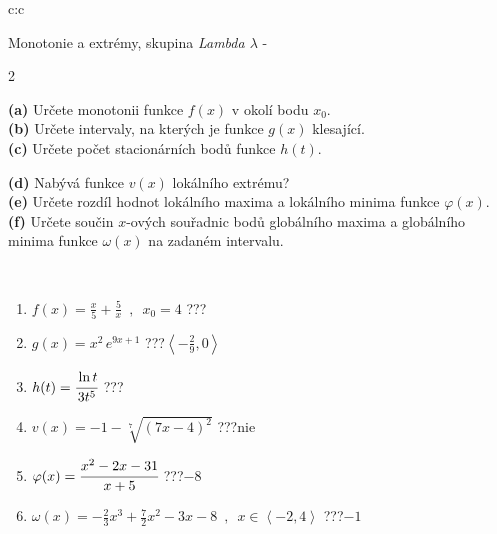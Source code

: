 \documentclass[10pt]{report}
\begin{document}
\newpage
\thispagestyle{empty}
\begin{tabular}{c:c}
\begin{minipage}[c][104.5mm][t]{0.5\linewidth}
\begin{center}
\vspace{7mm}
{\huge Monotonie a extrémy, skupina \textit{Lambda $\lambda$} -}\\[5mm]
\begin{minipage}{0.95\linewidth}
\begin{center}
{\small \begin{multicols}{2} \raggedright
\textbf{(a)} Určete monotonii funkce \(f(x)\) v okolí bodu \(x_0\). \\[1mm]
\textbf{(b)} Určete intervaly, na kterých je funkce \(g(x)\) klesající. \\[1mm]
\textbf{(c)} Určete počet stacionárních bodů funkce \(h(t)\). \par \columnbreak
\textbf{(d)} Nabývá funkce \(v(x)\) lokálního extrému? \\[1mm]
\textbf{(e)} Určete rozdíl hodnot lokálního maxima a lokálního minima funkce \(\varphi(x)\). \\[1mm]
\textbf{(f)} Určete součin \(x\)-ových souřadnic bodů globálního maxima a globálního minima funkce \(\omega(x)\) na zadaném intervalu. \\[1mm]
\end{multicols}
}
\end{center}
\end{minipage}
\\[4mm]
\begin{minipage}{0.79\linewidth}
\begin{center}
\begin{varwidth}{\linewidth}
\begin{enumerate}
\normalsize
\item $f(x)=\frac{x}{5}+\frac{5}{x} \enspace , \enspace x_0=4$\quad \dotfill\; ???\;\dotfill \quad {}
\item $g(x)=x^2\, e^{9x+1}$\quad \dotfill\; ???\;\dotfill \quad $\left\langle-\frac{2}{9} , 0\right\rangle$
\item $h(t)=\cfrac{\ln t}{3t^5}$\quad \dotfill\; ???\;\dotfill {}
\item $v(x)=-1-\sqrt[7]{(7x-4)^2}$\quad \dotfill\; ???\;\dotfill \quad $\text{nie}$
\item $\varphi(x)=\cfrac{x^2-2x-31}{x+5}$\quad \dotfill\; ???\;\dotfill \quad $-8$
\item $\omega(x)=-\frac{2}{3}x^3+\frac{7}{2}x^2-3x-8 \enspace , \enspace x\in\left\langle-2 , 4\right\rangle$\quad \dotfill\; ???\;\dotfill \quad $-1$

\end{enumerate}
\end{varwidth}
\end{center}
\end{minipage}
\end{center}
\end{minipage}
\end{tabular}
\end{document}
